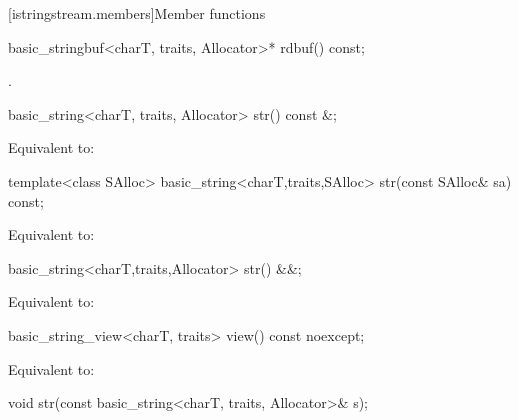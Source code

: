 [istringstream.members]{Member functions}

%
\begin{itemdecl}
basic_stringbuf<charT, traits, Allocator>* rdbuf() const;
\end{itemdecl}

\begin{itemdescr}
\pnum
\returns
{}.
\end{itemdescr}

%
\begin{itemdecl}
basic_string<charT, traits, Allocator> str() const &;
\end{itemdecl}

\begin{itemdescr}
\pnum
\effects
Equivalent to: 
\end{itemdescr}

%
\begin{itemdecl}
template<class SAlloc>
  basic_string<charT,traits,SAlloc> str(const SAlloc& sa) const;
\end{itemdecl}

\begin{itemdescr}
\pnum
\effects
Equivalent to: 
\end{itemdescr}

%
\begin{itemdecl}
basic_string<charT,traits,Allocator> str() &&;
\end{itemdecl}

\begin{itemdescr}
\pnum
\effects
Equivalent to: 
\end{itemdescr}

%
\begin{itemdecl}
basic_string_view<charT, traits> view() const noexcept;
\end{itemdecl}

\begin{itemdescr}
\pnum
\effects
Equivalent to: 
\end{itemdescr}

%
\begin{itemdecl}
void str(const basic_string<charT, traits, Allocator>& s);
\end{itemdecl}

